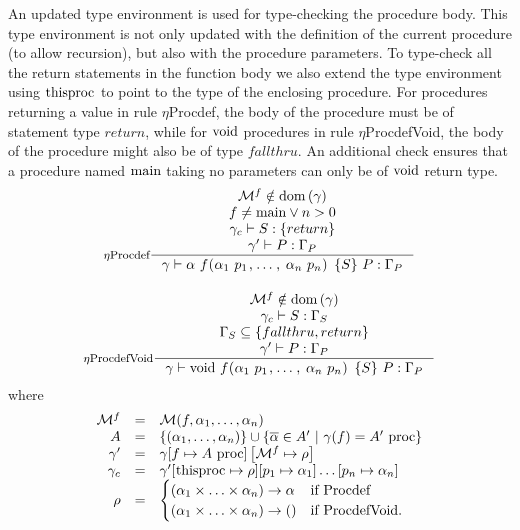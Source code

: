 \documentclass[a4paper, 10pt, draft]{report}
\newcommand{\mycode}[1]{\ensuremath{\mbox{\lstinline{#1}}}}
\begin{document}
An updated type environment is used for type-checking the procedure body. This
type environment is not only updated with the definition of the current
procedure (to allow recursion), but also with the procedure parameters. To
type-check all the return statements in the function body we also extend the
type environment using \mycode{thisproc} to point to the type of the enclosing
procedure. For procedures returning a value in rule $\eta$Procdef, the body of
the procedure must be of statement type $return$, while for \mycode{void}
procedures in rule $\eta$ProcdefVoid, the body of the procedure might also be
of type $fallthru$. An additional check ensures that a procedure named
\mycode{main} taking no parameters can only be of \mycode{void} return type.
\[\begin{array}{c}
\inference[$\eta$Procdef]{
  \mathcal{M}^f \notin \operatorname{dom}\left( \gamma \right) \\
    f \neq \mycode{main} \lor n > 0 \\
    \gamma_c |- S : \left\{ return \right\} \\
    \gamma' |- P : \Gamma_P
}{
  \gamma |- \alpha\ f\mycode{(} \alpha_1\ p_1 \mycode{,} \ldots \mycode{,}\ \alpha_n\ p_n\mycode{) \{}S\mycode{\}}\ P : \Gamma_P
} \\[2em]
\inference[$\eta$ProcdefVoid]{
  \mathcal{M}^f \notin \operatorname{dom}\left( \gamma \right) \\
    \gamma_c |- S : \Gamma_S \\
    \Gamma_S \subseteq \left\{ fallthru, return \right\} \\
    \gamma' |- P : \Gamma_P
}{
  \gamma |- \mycode{void}\ f\mycode{(} \alpha_1\ p_1 \mycode{,} \ldots \mycode{,}\ \alpha_n\ p_n\mycode{) \{}S\mycode{\}}\ P : \Gamma_P
}
\end{array} \]
where \[\begin{array}{rcl}
  \mathcal{M}^f & = & \mathcal{M}(f,\alpha_1,\ldots,\alpha_n) \\
    A           & = & 
      \left\{ (\alpha_1,\ldots,\alpha_n) \right\} \cup 
      \left\{ \overline{\alpha} \in A'\ |\ \gamma(f) = A'\ \mycode{proc} \right\} \\
    \gamma'     & = & \gamma[f \mapsto A\ \mycode{proc}]\left[ \mathcal{M}^f \mapsto \rho \right] \\
    \gamma_c    & = & \gamma'[\mycode{thisproc} \mapsto \rho]
                             [p_1 \mapsto \alpha_1]\dots[p_n \mapsto \alpha_n] \\
    \rho        & = & \begin{cases} 
       (\alpha_1\times\ldots\times\alpha_n)\to\alpha & \text{if Procdef} \\
       (\alpha_1\times\ldots\times\alpha_n)\to() & \text{if ProcdefVoid}. \\
    \end{cases}
\end{array}\]
\vspace{0.5cm}
\end{document}
